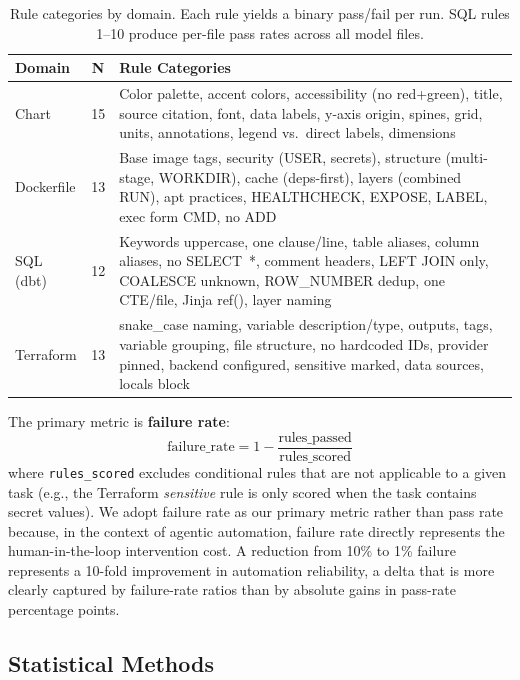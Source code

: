 \documentclass[sigconf,nonacm]{acmart}
\begin{document}
\begin{table}[t]
\caption{Rule categories by domain. Each rule yields a binary pass/fail per
run. SQL rules 1--10 produce per-file pass rates across all model files.}
\label{tab:rules}
\centering\small
\begin{tabular}{p{2.2cm}cp{5.3cm}}
\toprule
\textbf{Domain} & \textbf{N} & \textbf{Rule Categories} \\
\midrule
Chart & 15 & Color palette, accent colors, accessibility (no red+green),
  title, source citation, font, data labels, y-axis origin, spines, grid,
  units, annotations, legend vs.\ direct labels, dimensions \\
Dockerfile & 13 & Base image tags, security (USER, secrets), structure
  (multi-stage, WORKDIR), cache (deps-first), layers (combined RUN), apt
  practices, HEALTHCHECK, EXPOSE, LABEL, exec form CMD, no ADD \\
SQL (dbt) & 12 & Keywords uppercase, one clause/line, table aliases, column
  aliases, no SELECT~*, comment headers, LEFT JOIN only, COALESCE unknown,
  ROW\_NUMBER dedup, one CTE/file, Jinja ref(), layer naming \\
Terraform & 13 & snake\_case naming, variable description/type, outputs, tags,
  variable grouping, file structure, no hardcoded IDs, provider pinned,
  backend configured, sensitive marked, data sources, locals block \\
\bottomrule
\end{tabular}
\end{table}

The primary metric is \textbf{failure rate}:
\[
  \text{failure\_rate} = 1 - \frac{\text{rules\_passed}}{\text{rules\_scored}}
\]
where \texttt{rules\_scored} excludes conditional rules that are not applicable
to a given task (e.g., the Terraform \emph{sensitive} rule is only scored when
the task contains secret values). We adopt failure rate as our primary metric
rather than pass rate because, in the context of agentic automation, failure
rate directly represents the human-in-the-loop intervention cost. A reduction
from 10\% to 1\% failure represents a 10-fold improvement in automation
reliability, a delta that is more clearly captured by failure-rate ratios than
by absolute gains in pass-rate percentage points.

\subsection{Statistical Methods}\label{sec:stats}
\end{document}
